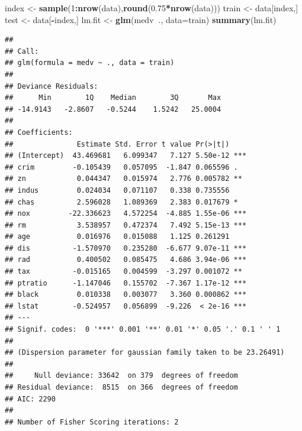 \documentclass[]{book}
\newenvironment{Shaded}{\begin{snugshade}}{\end{snugshade}}
\newcommand{\KeywordTok}[1]{\textcolor[rgb]{0.13,0.29,0.53}{\textbf{#1}}}
\newcommand{\DataTypeTok}[1]{\textcolor[rgb]{0.13,0.29,0.53}{#1}}
\newcommand{\DecValTok}[1]{\textcolor[rgb]{0.00,0.00,0.81}{#1}}
\newcommand{\FloatTok}[1]{\textcolor[rgb]{0.00,0.00,0.81}{#1}}
\newcommand{\StringTok}[1]{\textcolor[rgb]{0.31,0.60,0.02}{#1}}
\newcommand{\OperatorTok}[1]{\textcolor[rgb]{0.81,0.36,0.00}{\textbf{#1}}}
\newcommand{\NormalTok}[1]{#1}
\begin{document}
\begin{Shaded}
\begin{Highlighting}[]
\NormalTok{index <-}\StringTok{ }\KeywordTok{sample}\NormalTok{(}\DecValTok{1}\OperatorTok{:}\KeywordTok{nrow}\NormalTok{(data),}\KeywordTok{round}\NormalTok{(}\FloatTok{0.75}\OperatorTok{*}\KeywordTok{nrow}\NormalTok{(data)))}
\NormalTok{train <-}\StringTok{ }\NormalTok{data[index,]}
\NormalTok{test <-}\StringTok{ }\NormalTok{data[}\OperatorTok{-}\NormalTok{index,]}
\NormalTok{lm.fit <-}\StringTok{ }\KeywordTok{glm}\NormalTok{(medv}\OperatorTok{~}\NormalTok{., }\DataTypeTok{data=}\NormalTok{train)}
\KeywordTok{summary}\NormalTok{(lm.fit)}
\end{Highlighting}
\end{Shaded}

\begin{verbatim}
## 
## Call:
## glm(formula = medv ~ ., data = train)
## 
## Deviance Residuals: 
##      Min        1Q    Median        3Q       Max  
## -14.9143   -2.8607   -0.5244    1.5242   25.0004  
## 
## Coefficients:
##               Estimate Std. Error t value Pr(>|t|)    
## (Intercept)  43.469681   6.099347   7.127 5.50e-12 ***
## crim         -0.105439   0.057095  -1.847 0.065596 .  
## zn            0.044347   0.015974   2.776 0.005782 ** 
## indus         0.024034   0.071107   0.338 0.735556    
## chas          2.596028   1.089369   2.383 0.017679 *  
## nox         -22.336623   4.572254  -4.885 1.55e-06 ***
## rm            3.538957   0.472374   7.492 5.15e-13 ***
## age           0.016976   0.015088   1.125 0.261291    
## dis          -1.570970   0.235280  -6.677 9.07e-11 ***
## rad           0.400502   0.085475   4.686 3.94e-06 ***
## tax          -0.015165   0.004599  -3.297 0.001072 ** 
## ptratio      -1.147046   0.155702  -7.367 1.17e-12 ***
## black         0.010338   0.003077   3.360 0.000862 ***
## lstat        -0.524957   0.056899  -9.226  < 2e-16 ***
## ---
## Signif. codes:  0 '***' 0.001 '**' 0.01 '*' 0.05 '.' 0.1 ' ' 1
## 
## (Dispersion parameter for gaussian family taken to be 23.26491)
## 
##     Null deviance: 33642  on 379  degrees of freedom
## Residual deviance:  8515  on 366  degrees of freedom
## AIC: 2290
## 
## Number of Fisher Scoring iterations: 2
\end{verbatim}

\begin{Shaded}
\end{Shaded}
\end{document}
